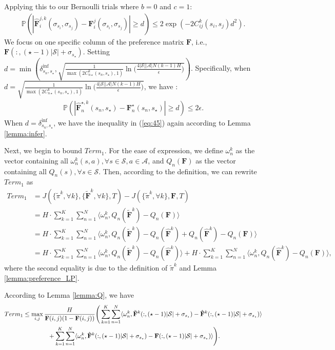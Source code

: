 \documentclass{article} %
\def\eqref#1{equation~\ref{#1}}
\newcommand{\I}{\sigma}
\newcommand{\bF}{\mathbf{F}}
\newcommand{\cA}{\mathcal{A}}
\newcommand{\cS}{\mathcal{S}}
\renewcommand{\eqref}[1]{(\ref{#1})}
\begin{document}
{Applying this to our Bernoulli trials where $b = 0$ and $c = 1$:
\begin{align}
    \mathbb{P}\left(\left|\hat{\bF}_i^{j,k}(\sigma_{s_i}, \sigma_{s_j}) -\bF_i^j(\sigma_{s_i}, \sigma_{s_j})\right| \geq d\right) \leq 2 \exp\left(-2C^k_{ij}(s_i, s_j)d^2\right).
\end{align}
We focus on one specific column of the preference matrix $\bF$, i.e., $\bF(: ,(\star-1)|\cS|+\I_{s_\star})$. 
Setting $d = \min\left(\delta^{\text{inf}}_{s_n, s_{\star}},\sqrt{\frac{1}{\max(2C_{n\star}^k(s_n, s_\star),1)}\ln\!\Big(\frac{4|\cS||\cA|N(k\!-\!1)H}{\epsilon}\Big)}\right)$. Specifically, when $d=\sqrt{\frac{1}{\max(2C_{n\star}^k(s_n, s_\star),1)}\ln\!\Big(\frac{4|\cS||\cA|N(k\!-\!1)H}{\epsilon}\Big)}$, we have :
\begin{align} \label{eq:45}   \mathbb{P}\left(\left|\hat{\bF}_n^{\star,k}(s_n, s_\star) - \bF_n^\star(s_n, s_\star)\right| \geq d\right) \leq 2\epsilon.
\end{align}
When $d=\delta^{\text{inf}}_{s_n, s_{\star}}$, we have the inequality in \eqref{eq:45} again according to Lemma \ref{lemma:infer}.


Next, we begin to bound $Term_1$. For the ease of expression, we define $\omega_n^k$ as the vector containing all $\omega_n^k(s,a), \forall s\in\cS, a\in\cA$, and $Q_n(\bF)$ as the vector containing all $Q_n(s), \forall s\in \cS$. Then,
according to the definition, we can rewrite $Term_1$ as
\begin{align}\nonumber
    Term_1&=J( \{\tilde{\pi}^k, \forall k\}, \{\tilde{\bF}^k, \forall k\}, T)-J(\{\tilde{\pi}^k, \forall k\}, \bF, T)\\
    &=H\cdot\sum_{k=1}^K\sum_{n=1}^N\langle  \omega_n^k, Q_n(\tilde{\bF}^k)-Q_n(\bF) \rangle\nonumber\\
    &=H\cdot\sum_{k=1}^K\sum_{n=1}^N\langle  \omega_n^k, Q_n(\tilde{\bF}^k)-Q_n(\hat{\bF}^k)+ Q_n(\hat{\bF}^k)-Q_n(\bF)\rangle\nonumber\\
    &=H\cdot\sum_{k=1}^K\sum_{n=1}^N\langle  \omega_n^k, Q_n(\tilde{\bF}^k)-Q_n(\hat{\bF}^k)\rangle+H\cdot\sum_{k=1}^K\sum_{n=1}^N\langle \omega_n^k,  Q_n(\hat{\bF}^k)-Q_n(\bF)\rangle,
\end{align} 
where the second equality is due to the definition of $\tilde{\pi}^k$ and Lemma \ref{lemma:preference_LP}. 

According to Lemma \ref{lemma:Q}, we have
\begin{align}
    Term_1&\leq \max_{i,j}\frac{H}{\bF(i,j)(1-\bF(i,j))}\Bigg(\sum_{k=1}^K\sum_{n=1}^N\langle  \omega_n^k, \tilde{\bF}^k(: ,(\star-1)|\cS|+\I_{s_\star})-\hat{\bF}^k(: ,(\star-1)|\cS|+\I_{s_\star})\rangle\nonumber\allowdisplaybreaks\\
    &\qquad\qquad+\sum_{k=1}^K\sum_{n=1}^N\langle \omega_n^k,  \hat{\bF}^k(: ,(\star-1)|\cS|+\I_{s_\star})-\bF(: ,(\star-1)|\cS|+\I_{s_\star})\rangle\Bigg).
\end{align}
 
}
\end{document}
